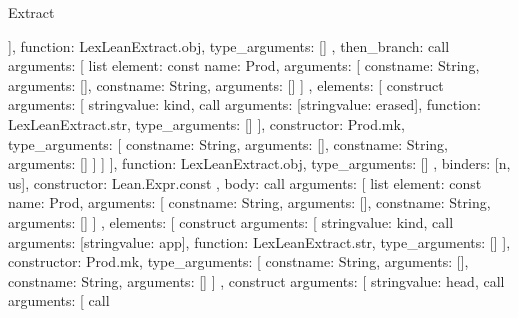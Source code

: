 \begin{lexlean}{Extract}
\begin{toolingmodule}
{{{{{{{{                    }
                  ],
                  function: LexLeanExtract.obj,
                  type_arguments: []
                }
              },
              then_branch: call{
                arguments: [
                  list{
                    element: const{
                      name: Prod,
                      arguments: [
                        const{name: String, arguments: []},
                        const{name: String, arguments: []}
                      ]
                    },
                    elements: [
                      construct{
                        arguments: [
                          string{value: kind},
                          call{
                            arguments: [string{value: erased}],
                            function: LexLeanExtract.str,
                            type_arguments: []
                          }
                        ],
                        constructor: Prod.mk,
                        type_arguments: [
                          const{name: String, arguments: []},
                          const{name: String, arguments: []}
                        ]
                      }
                    ]
                  }
                ],
                function: LexLeanExtract.obj,
                type_arguments: []
              }
            },
            binders: [n, us],
            constructor: Lean.Expr.const
          },
          {
            body: call{
              arguments: [
                list{
                  element: const{
                    name: Prod,
                    arguments: [
                      const{name: String, arguments: []},
                      const{name: String, arguments: []}
                    ]
                  },
                  elements: [
                    construct{
                      arguments: [
                        string{value: kind},
                        call{
                          arguments: [string{value: app}],
                          function: LexLeanExtract.str,
                          type_arguments: []
                        }
                      ],
                      constructor: Prod.mk,
                      type_arguments: [
                        const{name: String, arguments: []},
                        const{name: String, arguments: []}
                      ]
                    },
                    construct{
                      arguments: [
                        string{value: head},
                        call{
                          arguments: [
                            call{
}}}}}}}}}
\end{toolingmodule}
\end{lexlean}
